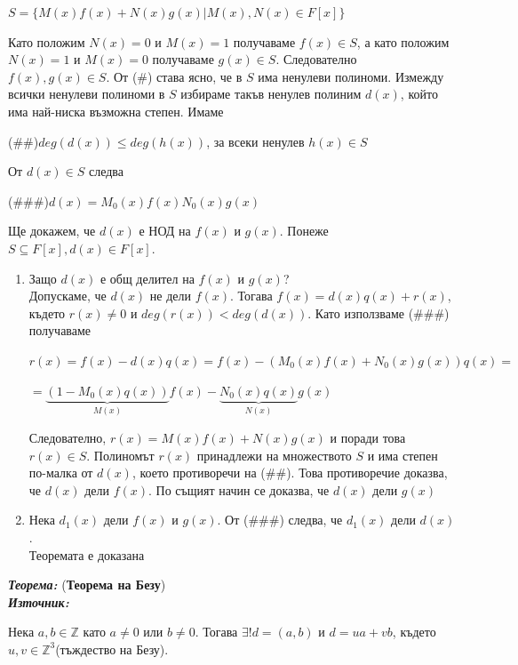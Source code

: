 \documentclass[11pt]{article} %
\newcommand{\italicBold}[1]{\textbf{\emph{#1}}}
\newcommand{\theorem}{\italicBold{Теорема: }}
\newcommand{\source}{\italicBold{Източник: }}
\newcommand{\curlies}[1]{\{#1\}}
\newcommand{\enumNum}{\renewcommand{\theenumi}{\arabic{enumi}}}
\begin{document}
\centerline{$S = \curlies{M(x)f(x)+N(x)g(x)|M(x),N(x)\in F[x]}$}

Като положим $N(x) = 0$ и $M(x) = 1$ получаваме $f(x) \in S$, а като положим $N(x) = 1$ и $M(x) = 0$ получаваме $g(x) \in S$. Следователно $f(x), g(x) \in S$. От (\#) става ясно, че в $S$ има ненулеви полиноми. Измежду всички ненулеви полиноми в $S$ избираме такъв ненулев полиним $d(x)$, който има най-ниска възможна степен. Имаме\\

\centerline{(\#\#)$deg(d(x)) \leq deg(h(x))$, за всеки ненулев $h(x) \in S$}

От $d(x) \in S$ следва \\

\centerline{(\#\#\#)$d(x) = M_{0}(x)f(x)N_{0}(x)g(x)$}

Ще докажем, че $d(x)$ е НОД на $f(x)$ и $g(x)$. Понеже $S \subseteq F[x], d(x) \in F[x]$.

\enumNum
\begin{enumerate}
	\item Защо $d(x)$ е общ делител на $f(x)$ и $g(x)$?\\
		Допускаме, че $d(x)$ не дели $f(x)$. Тогава $f(x) = d(x)q(x) + r(x)$, където $r(x) \neq 0$ и $deg(r(x)) < deg(d(x))$. Като използваме (\#\#\#) получаваме \newpage
		
		\centerline{$r(x) = f(x)-d(x)q(x)=f(x)-(M_{0}(x)f(x)+N_{0}(x)g(x))q(x)=$}
		\centerline{$=\underbrace{(1-M_{0}(x)q(x))}_{M(x)}f(x)-\underbrace{N_{0}(x)q(x)}_{N(x)}g(x)$}
		Следователно, $r(x)=M(x)f(x)+N(x)g(x)$ и поради това $r(x)\in S$. Полиномът $r(x)$ принадлежи на множеството $S$ и има степен по-малка от $d(x)$, което противоречи на (\#\#). Това противоречие доказва, че $d(x)$ дели $f(x)$. По същият начин се доказва, че $d(x)$ дели $g(x)$\\
	\item Нека $d_{1}(x)$ дели $f(x)$ и $g(x)$. От (\#\#\#) следва, че $d_{1}(x)$ дели $d(x)$.\\
	Теоремата е доказана\\\par
\end{enumerate} 

\theorem (\textbf{Теорема на Безу})\\
\source {}\par

Нека $a,b \in \mathbb{Z}$ като $a \neq 0$ или $b \neq 0$. Тогава $\exists!d=(a,b)$ и $d = ua + vb$, където $u, v \in \mathbb{Z}^{3}$(тъждество на Безу).\\
\end{document}

